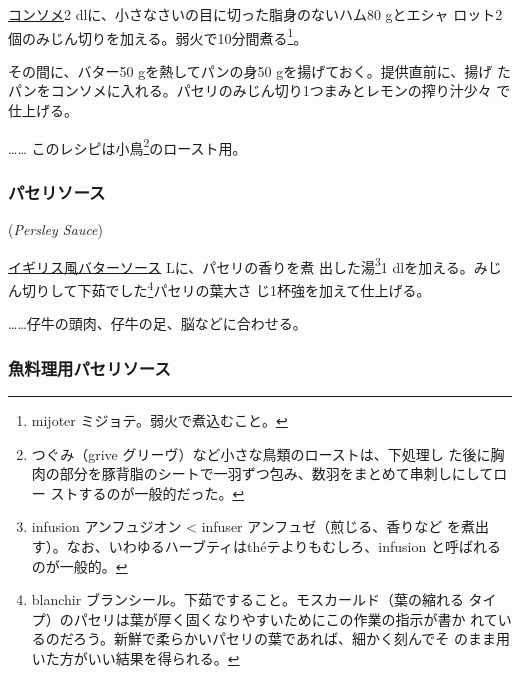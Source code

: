 \begin{recette}
\protect\hyperlink{}{コンソメ}2
dlに、小さなさいの目に切った脂身のないハム80 gとエシャ
ロット2個のみじん切りを加える。弱火で10分間煮る\footnote{mijoter
  ミジョテ。弱火で煮込むこと。}。

その間に、バター50 gを熱してパンの身50 gを揚げておく。提供直前に、揚げ
たパンをコンソメに入れる。パセリのみじん切り1つまみとレモンの搾り汁少々
で仕上げる。

\ldots{}\ldots{} このレシピは小鳥\footnote{つぐみ（grive
  グリーヴ）など小さな鳥類のローストは、下処理し
  た後に胸肉の部分を豚背脂のシートで一羽ずつ包み、数羽をまとめて串刺しにしてロー
  ストするのが一般的だった。}のロースト用。

\maeaki

\hypertarget{perseley-sauce}{%
\subsubsection{パセリソース}\label{perseley-sauce}}

\hspace{1em}(\emph{Persley Sauce})


\protect\hyperlink{bread-sauce}{イギリス風バターソース}\undemi{}
Lに、パセリの香りを煮 出した湯\footnote{infusion アンフュジオン
  \textless{} infuser アンフュゼ（煎じる、香りなど
  を煮出す）。なお、いわゆるハーブティはthéテよりもむしろ、infusion
  と呼ばれるのが一般的。}1
dlを加える。みじん切りして下茹でした\footnote{blanchir
  ブランシール。下茹ですること。モスカールド（葉の縮れる
  タイプ）のパセリは葉が厚く固くなりやすいためにこの作業の指示が書か
  れているのだろう。新鮮で柔らかいパセリの葉であれば、細かく刻んでそ
  のまま用いた方がいい結果を得られる。}パセリの葉大さ
じ1杯強を加えて仕上げる。

\ldots{}\ldots{}仔牛の頭肉、仔牛の足、脳などに合わせる。

\maeaki

\hypertarget{ux9b5aux6599ux7406ux7528ux30d1ux30bbux30eaux30bdux30fcux30b9}{%
\subsubsection{魚料理用パセリソース}\label{ux9b5aux6599ux7406ux7528ux30d1ux30bbux30eaux30bdux30fcux30b9}}


\end{recette}
